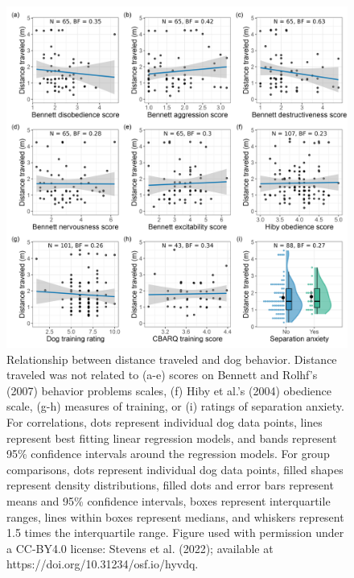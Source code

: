 \documentclass[
  pub,floatsintext]{apa6}
\begin{document}
\begin{figure}

{\centering \includegraphics[width=0.95\linewidth]{figures/dog_behavior} 

}

\caption{Relationship between distance traveled and dog behavior. Distance traveled was not related to (a-e) scores on Bennett and Rolhf's (2007) behavior problems scales, (f) Hiby et al.'s (2004) obedience scale, (g-h) measures of training, or (i) ratings of separation anxiety. For correlations, dots represent individual dog data points, lines represent best fitting linear regression models, and bands represent 95\% confidence intervals around the regression models. For group comparisons, dots represent individual dog data points, filled shapes represent density distributions, filled dots and error bars represent means and 95\% confidence intervals, boxes represent interquartile ranges, lines within boxes represent medians, and whiskers represent 1.5 times the interquartile range.  Figure used with permission under a CC-BY4.0 license: Stevens et al. (2022); available at https://doi.org/10.31234/osf.io/hyvdq.}\label{fig:dog-behavior}
\end{figure}
\end{document}
